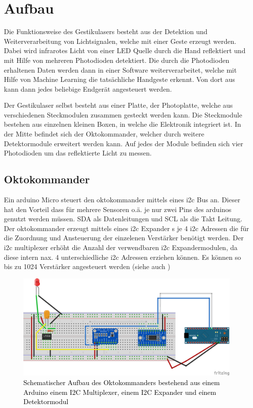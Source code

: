 \chapter{Aufbau}
\label{ch:Funktionsweise und Aufbau}
Die Funktionsweise des Gestikulasers besteht aus der Detektion und Weiterverarbeitung von Lichtsignalen, welche mit einer Geste erzeugt werden. Dabei wird infrarotes Licht von einer LED Quelle durch die Hand reflektiert und mit Hilfe von mehreren Photodioden detektiert. Die durch die Photodioden erhaltenen Daten werden dann in einer Software weiterverarbeitet, welche mit Hilfe von Machine Learning die tatsächliche Handgeste erkennt. Von dort aus kann dann jedes beliebige Endgerät angesteuert werden.


Der Gestikulaser selbst besteht aus einer Platte, der Photoplatte, welche aus verschiedenen Steckmodulen zusammen gesteckt werden kann. Die Steckmodule bestehen aus einzelnen kleinen Boxen, in welche die Elektronik integriert ist. In der Mitte befindet sich der Oktokommander, welcher durch weitere Detektormodule erweitert werden kann. Auf jedes der Module befinden sich vier Photodioden um das reflektierte Licht zu messen. 



\section{Oktokommander}
\label{sec:Oktokommander}

Ein arduino Micro steuert den oktokommander mittels eines i2c Bus an. Dieser hat den Vorteil dass für mehrere Sensoren o.ä. je nur zwei Pins des arduinos genutzt werden müssen. SDA als Datenleitungen und SCL als die Takt Leitung.
Der oktokommander erzeugt mittels eines i2c Expander s je 4 i2c Adressen die für die Zuordnung und Ansteuerung der einzelenen Verstärker benötigt werden.
Der i2c multiplexer erhöht die Anzahl der verwendbaren i2c Expandermodulen, da diese intern nax. 4 unterschiedliche i2c Adressen erziehen können. Es können so bis zu 1024 Verstärker angesteuert werden
 (siehe auch )  


\begin{figure}[h]
	\centering
	\includegraphics[scale=0.8]{../figures/oktokommander.png}
	\caption{\textcolor{black}{Schematischer Aufbau des Oktokommanders bestehend aus einem Arduino einem I2C Multiplexer, einem I2C Expander und einem Detektormodul}}
	\label{fig:oktokommander}
\end{figure}

